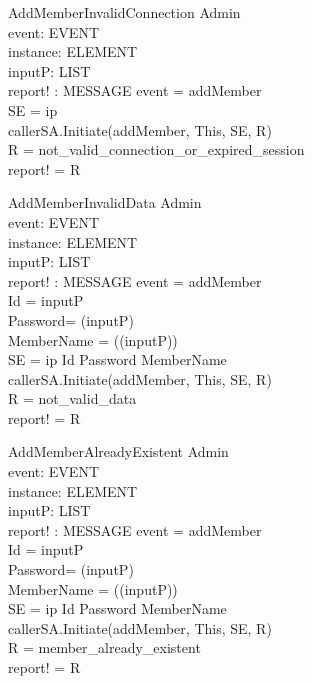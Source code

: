\begin{schema}{AddMemberInvalidConnection}
\Xi Admin \\
event: EVENT \\
instance: ELEMENT \\
inputP: LIST \\
report! : MESSAGE 
\where event = addMember \\
SE = \lseq ip \rseq \\
callerSA.Initiate(addMember, This, SE, R) \\
R = not\_valid\_connection\_or\_expired\_session \\
report! = R 
\end{schema}


\begin{schema}{AddMemberInvalidData}
\Xi Admin \\
event: EVENT \\
instance: ELEMENT \\
inputP: LIST \\
report! : MESSAGE 
\where event = addMember \\
Id = \head inputP \\
Password= \head (\tail inputP) \\
MemberName = \head (\tail (\tail inputP)) \\
SE = \lseq ip Id Password MemberName \rseq \\
callerSA.Initiate(addMember, This, SE, R) \\
R = not\_valid\_data \\ 
report! = R
\end{schema}

\begin{schema}{AddMemberAlreadyExistent}
\Xi Admin \\
event: EVENT \\
instance: ELEMENT \\
inputP: LIST \\
report! : MESSAGE 
\where event = addMember \\
Id = \head inputP \\
Password= \head (\tail inputP) \\
MemberName = \head (\tail (\tail inputP)) \\
SE = \lseq ip Id Password MemberName \rseq \\
callerSA.Initiate(addMember, This, SE, R) \\
R = member\_already\_existent \\ 
report! = R
\end{schema}

